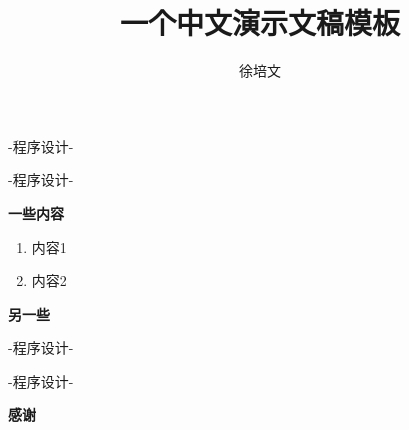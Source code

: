\documentclass{beamer}
\title{一个中文演示文稿模板}
\author{徐培文}
\date{} %
\newcommand{\system}{-程序设计-}
\begin{document}
\begin{frame}{{-程序设计-}}
  \titlepage
\end{frame}

\begin{frame}{{\system}}
\vspace*{-3cm} 

\textbf{一些内容}
\begin{enumerate}

\item 内容1
\item 内容2
\end{enumerate}
\textbf{另一些}
\end{frame}

\begin{frame}{{\system}}
\end{frame}


\begin{frame}{{\system}}


\raggedleft
\vspace*{\fill}
{\fontsize{24}{24}\textbf{感谢}}


\end{frame}
\end{document}
